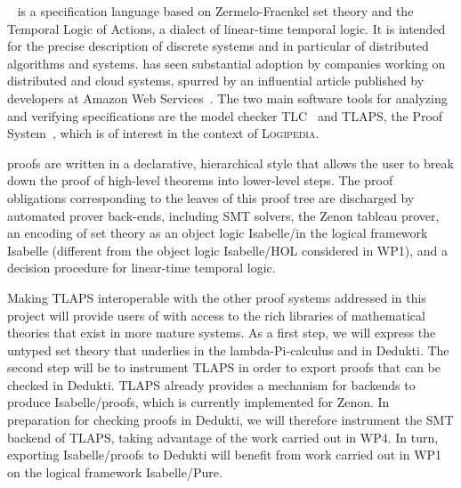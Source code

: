 

\tlaplus~\cite{lamport:specifying} is a specification language based on
Zermelo-Fraenkel set theory and the Temporal Logic of Actions, a dialect of
linear-time temporal logic. It is intended for the precise description of
discrete systems and in particular of distributed algorithms and systems.
\tlaplus has seen substantial adoption by companies working on distributed and
cloud systems, spurred by an influential article published by developers at
Amazon Web Services~\cite{newcombe:amazon-cacm}. The two main software tools for
analyzing and verifying \tlaplus specifications are the model checker
TLC~\cite{yu:model-checking} and TLAPS, the \tlaplus Proof
System~\cite{cousineau:tla-proofs}, which is of interest in the context of
\textsc{Logipedia}.

\tlaplus proofs are written in a declarative, hierarchical style that allows the
user to break down the proof of high-level theorems into lower-level steps. The
proof obligations corresponding to the leaves of this proof tree are discharged
by automated prover back-ends, including SMT solvers, the Zenon tableau prover,
an encoding of \tlaplus set theory as an object logic Isabelle/\tlaplus in the
logical framework Isabelle (different from the object logic Isabelle/HOL
considered in WP1), and a decision procedure for linear-time temporal logic.

Making TLAPS interoperable with the other proof systems addressed in this
project will provide users of \tlaplus with access to the rich libraries of
mathematical theories that exist in more mature systems. As a first step, we
will express the untyped set theory that underlies \tlaplus in the
lambda-Pi-calculus and in Dedukti. The second step will be to instrument TLAPS
in order to export proofs that can be checked in Dedukti. TLAPS already provides
a mechanism for backends to produce Isabelle/\tlaplus proofs, which is currently
implemented for Zenon. In preparation for checking \tlaplus proofs in Dedukti,
we will therefore instrument the SMT backend of TLAPS, taking advantage of the
work carried out in WP4. In turn, exporting Isabelle/\tlaplus proofs to Dedukti
will benefit from work carried out in WP1 on the logical framework
Isabelle/Pure.

